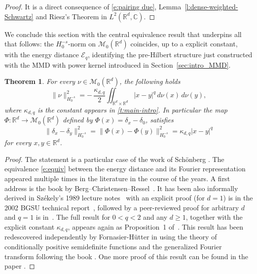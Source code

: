 \documentclass[12pt,a4paper,oneside]{amsart}
\theoremstyle{plain}
\newtheorem{theorem}{Theorem}[section]
\theoremstyle{definition}
\numberwithin{equation}{section}
\numberwithin{figure}{section}
\numberwithin{table}{section}
\theoremstyle{remark}
\newcommand{\R}{\mathbb{R}}
\newcommand{\calM}{\mathcal{M}}
\begin{document}
\begin{proof}
It is a direct consequence of \eqref{e:pairing due}, Lemma~\ref{l:dense-weighted-Schwartz} and Riesz's Theorem in $L^2(\R^d,\mathbb{C})$.
\end{proof}
% 
We conclude this section with the central equivalence result that 
underpins all that follows: the ${H}^{-s}_0$-norm on $\calM_0(\R^d)$ 
coincides, up to a explicit constant, with the energy distance 
$\mathcal{E}_q$, identifying the pre-Hilbert structure just constructed 
with the MMD with power kernel introduced in Section~\ref{sec:intro_MMD}.
% 
\begin{theorem}\label{t:equivalenza}
For every $\nu \in \calM_0(\R^d)$, the following holds
\begin{equation}\label{e:equiv}
\|\nu\|_{H_0^{-s}}^2
= -\,\frac{\kappa_{d,q}}{2}\iint_{\R^d\times\R^d}|x-y|^q\,d\nu(x)\,d\nu(y),
\end{equation}
where $\kappa_{d,q}$ is the constant appears in \ref{t:main-intro}. In particular the map $\Phi:\R^d\to \mathcal{M}_0(\R^d)$ defined by $\Phi(x)=\delta_x-\delta_0$, satisfies
\begin{equation}\label{e:isometry}
   \|\delta_x -\delta_{y}\|^2_{H^{-s}_0}= \|\Phi(x) -\Phi(y)\|^2_{H^{-s}_0}= \kappa_{d,q}|x-y|^q
\end{equation}
for every $x,y\in \R^d$.
\end{theorem}

\begin{proof}
The statement is a particular case of the work of Sch\"onberg \cite{schoenberg1938positive}. The equivalence \eqref{e:equiv} between the energy distance
and its Fourier representation
appeared multiple times in the literature in the course of the years. A first address is the book by Berg--Christensen--Ressel~\cite[Chapter 3, Section 2, Corollary 2.10]{BergChristensenRessel1984}.
It has been also informally derived in
Sz\'ekely's 1989 lecture notes~\cite{szekely1989} with an  explicit proof
(for $d=1$) is in the 2002 BGSU technical report~\cite{szekely2002}, followed by a peer-reviewed proof for arbitrary $d$ and $q=1$ is in~\cite{szekely2005}.
The full result for $0<q<2$ and any $d\geq 1$, together with the explicit
constant $\kappa_{d,q}$, appears again as Proposition~1 of~\cite{szekely2013energy}.
This result has been redescovered independently by Fornasier-Hütter in \cite[Theorem 3.6]{fornasier2014consistency} using the theory of conditionally positive semidefinite functions and the generalized Fourier transform following the book \cite{wendland2005}. One more proof of this result can be found in the paper \cite[Theorem 1]{auricchio2026kinetic}.
\end{proof}
\end{document}
